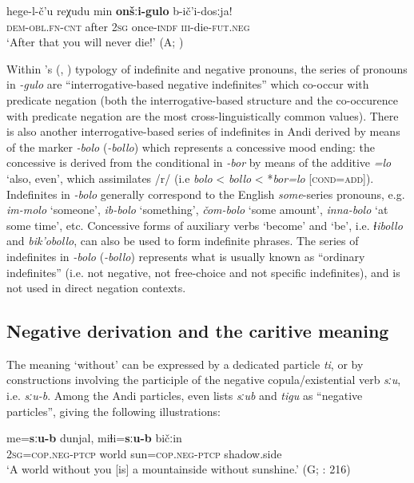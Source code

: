 \documentclass[output=paper,colorlinks=true, citecolor=brown]{langscibook}
\begin{document}
\ea
    \label{ex:and:55} 
    \gll hege{}-l{}-č’u reχudu min \textbf{onšːi{}-gulo} b{}-ič’i{}-dosːja!\\
          \textsc{dem{}-obl.fn-cnt} after \textsc{2sg} once-\textsc{indf} \textsc{iii}{}-die-\textsc{fut.neg} \\
    \glt ‘After that you will never die!’ (A; )
\z 

Within \citeauthor{Haspelmath1997}'s (\citeyear[Ch. 8]{Haspelmath1997}, \citeyear{Haspelmath2013-wals115}) typology of indefinite and negative pronouns, the series of pronouns in \textit{{}-gulo} are “interrogative-based negative indefinites” which co-occur with predicate negation (both the interrogative-based structure and the co-occurence with predicate negation are the most cross-linguis\-tically common values). There is also another interrogative-based series of indefinites in Andi derived by means of the marker \textit{{}-bolo} (\textit{\nobreakdash-bollo}) which represents a concessive mood ending: the concessive is derived from the conditional in \textit{\nobreakdash-bor} by means of the additive \textit{=lo} ‘also, even’, which assimilates /r/ (i.e \textit{bolo} < \textit{bollo} < *\textit{bor=lo} [\textsc{cond=add}]). Indefinites in \textit{{}-bolo} generally correspond to the English \textit{some}{}-series pronouns, e.g. \textit{im-molo} ‘someone’, \textit{ib-bolo} ‘something’, \textit{čom-bolo} ‘some amount’, \textit{inna-bolo} ‘at some time’, etc. Concessive forms of auxiliary verbs ‘become’ and ‘be’, i.e. \textit{ɬibollo} and \textit{bik’obollo}, can also be used to form indefinite phrases. The series of indefinites in \textit{{}-bolo} (\textit{\nobreakdash-bollo}) represents what is usually known as “ordinary indefinites” (i.e. not negative, not free-choice and not specific indefinites), and is not used in direct negation contexts.

\subsection{Negative derivation and the caritive meaning} \label{sec:and:3.3}

The meaning ‘without’ can be expressed by a dedicated particle \textit{ti}, or by constructions involving the participle of the negative copula/existential verb \textit{sːu}, i.e. \textit{sːu-b}. Among the Andi particles, \citet[216]{Salimov2010} even lists \textit{sːub} and \textit{tigu} as “negative particles”, giving the following illustrations:

\ea
    \label{ex:and:56}
    \gll me=\textbf{sːu{}-b} dunjal, miɬi=\textbf{sːu{}-b} bičːin\\
          \textsc{2sg}=\textsc{cop.neg-ptcp} world sun=\textsc{cop.neg-ptcp} shadow.side \\
    \glt ‘A world without you [is] a mountainside without sunshine.’ (G; \citealt{Salimov2010}: 216)
\z 
\end{document}
